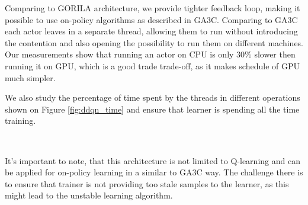 Comparing to GORILA architecture, we provide tighter feedback loop, making it possible to use
on-policy algorithms as described in GA3C. Comparing to GA3C each actor leaves in a separate
thread, allowing them to run without introducing the contention and also opening the possibility
to run them on different machines. Our measurements show that running an actor on CPU is only 30\%
slower then running it on GPU, which is a good trade trade-off, as it makes schedule of GPU much
simpler.

We also study the percentage of time spent by the threads in different operations shown
on Figure \ref{fig:ddqn_time} and ensure that learner is spending all the time training.

\begin{figure*}[h]
\\
\caption{Distribution of Actor and Learner threads time between operations}
\label{fig:ddqn_time}
\end{figure*}



It's important to note, that this architecture is not limited to Q-learning and can be applied
for on-policy learning in a similar to GA3C way. The challenge there is to ensure that trainer is
not providing too stale samples to the learner, as this might lead to the unstable learning
algorithm.
